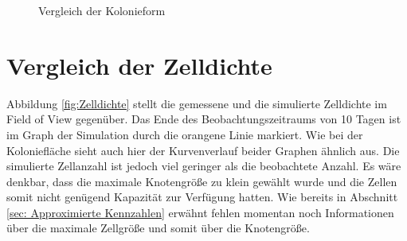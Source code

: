 \documentclass[11pt,a4paper,pointlessnumbers]{scrreprt}  %
\begin{document}
\begin{figure}[!ht]
	\caption{Vergleich der Kolonieform} 
	\label{fig:Kolonieform}
\end{figure} 

\newpage
\section{Vergleich der Zelldichte}
Abbildung \ref{fig:Zelldichte} stellt die gemessene und die simulierte Zelldichte im Field of View gegenüber. Das Ende des Beobachtungszeitraums von 10 Tagen ist im Graph der Simulation durch die orangene Linie markiert. Wie bei der Koloniefläche sieht auch hier der Kurvenverlauf beider Graphen ähnlich aus. Die simulierte Zellanzahl ist jedoch viel geringer als die beobachtete Anzahl. Es wäre denkbar, dass die maximale Knotengröße zu klein gewählt wurde und die Zellen somit nicht genügend Kapazität zur Verfügung hatten. Wie bereits in Abschnitt \ref{sec: Approximierte Kennzahlen} erwähnt fehlen momentan noch Informationen über die maximale Zellgröße und somit über die Knotengröße.
\end{document}
